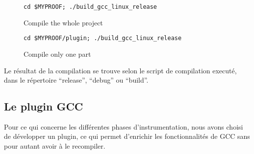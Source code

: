 \begin{figure}[here]
  \centering
  \verb#cd $MYPROOF; ./build_gcc_linux_release#
  \caption{Compile the whole project}
  \label{fig:compile_whole_project}
\end{figure}

\begin{figure}[here]
  \centering
  \verb#cd $MYPROOF/plugin; ./build_gcc_linux_release#
  \caption{Compile only one part}
  \label{fig:compile_one_part}
\end{figure}

Le résultat de la compilation se trouve selon le script de compilation executé, dans le répertoire ``release'', ``debug'' ou ``build''.

\subsection{Le plugin GCC}

Pour ce qui concerne les différentes phases d'instrumentation, nous avons choisi de développer un plugin, ce qui permet d'enrichir les fonctionnalités de GCC sans pour autant avoir à le recompiler.


